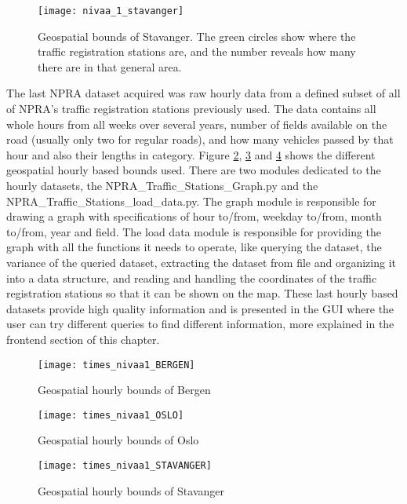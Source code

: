 \begin{figure}[ht]
\texttt{[image: nivaa\_1\_stavanger]}
\centering
\caption{Geospatial bounds of Stavanger. The green circles show where the traffic registration stations are, and the number reveals how many there are in that general area.}
\label{fig:boundsstavanger}
\end{figure}

The last NPRA dataset acquired was raw hourly data from a defined subset of all of NPRA's traffic registration stations previously used. The data contains all whole hours from all weeks over several years, number of fields available on the road (usually only two for regular roads), and how many vehicles passed by that hour and also their lengths in category. Figure \ref{fig:hboundsbergen}, \ref{fig:hboundsoslo} and \ref{fig:hboundsstavanger} shows the different geospatial hourly based bounds used. There are two modules dedicated to the hourly datasets, the NPRA\_Traffic\_Stations\_Graph.py and the NPRA\_Traffic\_Stations\_load\_data.py. The graph module is responsible for drawing a graph with specifications of hour to/from, weekday to/from, month to/from, year and field. The load data module is responsible for providing the graph with all the functions it needs to operate, like querying the dataset, the variance of the queried dataset, extracting the dataset from file and organizing it into a data structure, and reading and handling the coordinates of the traffic registration stations so that it can be shown on the map. These last hourly based datasets provide high quality information and is presented in the GUI where the user can try different queries to find different information, more explained in the frontend section of this chapter.

\begin{figure}[ht]
\texttt{[image: times\_nivaa1\_BERGEN]}
\centering
\caption{Geospatial hourly bounds of Bergen}
\label{fig:hboundsbergen}
\end{figure}

\begin{figure}[ht]
\texttt{[image: times\_nivaa1\_OSLO]}
\centering
\caption{Geospatial hourly bounds of Oslo}
\label{fig:hboundsoslo}
\end{figure}

\begin{figure}[ht]
\texttt{[image: times\_nivaa1\_STAVANGER]}
\centering
\caption{Geospatial hourly bounds of Stavanger}
\label{fig:hboundsstavanger}
\end{figure}

